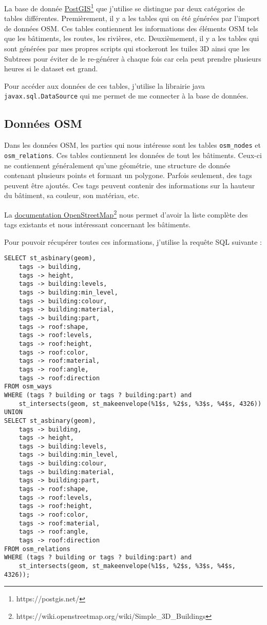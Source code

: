 La base de donnée \href{https://postgis.net/}{PostGIS}\footnote{https://postgis.net/} que j'utilise se distingue par deux catégories de tables différentes. Premièrement, il y a les tables qui on été générées par l'import de données OSM. Ces tables contiennent les informations des éléments OSM tels que les bâtiments, les routes, les rivières, etc. Deuxièmement, il y a les tables qui sont générées par mes propres scripts qui stockeront les tuiles 3D ainsi que les Subtrees pour éviter de le re-générer à chaque fois car cela peut prendre plusieurs heures si le dataset est grand.

Pour accéder aux données de ces tables, j'utilise la librairie java \texttt{javax.sql.DataSource} qui me permet de me connecter à la base de données.

\subsection{Données OSM}

Dans les données OSM, les parties qui nous intéresse sont les tables \texttt{osm\_nodes} et \texttt{osm\_relations}. Ces tables contiennent les données de tout les bâtiments. Ceux-ci ne contiennent généralement qu'une \Gls{géométrie}, une structure de donnée contenant plusieurs points et formant un polygone. Parfois seulement, des \Gls{tags} peuvent être ajoutés. Ces tags peuvent contenir des informations sur la hauteur du bâtiment, sa couleur, son matériau, etc.

La \href{https://wiki.openstreetmap.org/wiki/Simple_3D_Buildings}{documentation OpenStreetMap}\footnote{https://wiki.openstreetmap.org/wiki/Simple\_3D\_Buildings} nous permet d'avoir la liste complète des tags existants et nous intéressant concernant les bâtiments.

Pour pouvoir récupérer toutes ces informations, j'utilise la requête SQL suivante :

\newpage
\begin{verbatim}
SELECT st_asbinary(geom),
    tags -> building,
    tags -> height,
    tags -> building:levels,
    tags -> building:min_level,
    tags -> building:colour,
    tags -> building:material,
    tags -> building:part,
    tags -> roof:shape,
    tags -> roof:levels,
    tags -> roof:height,
    tags -> roof:color,
    tags -> roof:material,
    tags -> roof:angle,
    tags -> roof:direction
FROM osm_ways
WHERE (tags ? building or tags ? building:part) and
    st_intersects(geom, st_makeenvelope(%1$s, %2$s, %3$s, %4$s, 4326))
UNION
SELECT st_asbinary(geom),
    tags -> building,
    tags -> height,
    tags -> building:levels,
    tags -> building:min_level,
    tags -> building:colour,
    tags -> building:material,
    tags -> building:part,
    tags -> roof:shape,
    tags -> roof:levels,
    tags -> roof:height,
    tags -> roof:color,
    tags -> roof:material,
    tags -> roof:angle,
    tags -> roof:direction
FROM osm_relations
WHERE (tags ? building or tags ? building:part) and
    st_intersects(geom, st_makeenvelope(%1$s, %2$s, %3$s, %4$s, 4326));
\end{verbatim}


